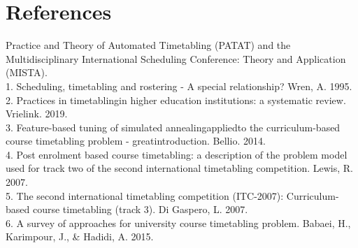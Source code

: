 \documentclass[a4paper]{report}
\begin{document}
\section*{References}

Practice and Theory of Automated Timetabling (PATAT) and the Multidisciplinary International Scheduling Conference: Theory and Application (MISTA). \\
1. Scheduling, timetabling and rostering - A special relationship? Wren, A. 1995. \\
2. Practices in timetablingin higher education institutions: a systematic review. Vrielink. 2019. \\
3. Feature-based tuning of simulated annealingappliedto the curriculum-based course timetabling problem - greatintroduction. Bellio. 2014. \\
4. Post enrolment based course timetabling: a description of the problem model used for track two of the second international timetabling competition. Lewis, R. 2007. \\
5. The second international timetabling competition (ITC-2007): Curriculum-based course timetabling (track 3). Di Gaspero, L. 2007. \\
6. A survey of approaches for university course timetabling problem. Babaei, H., Karimpour, J., & Hadidi, A. 2015. \\
\end{document}
